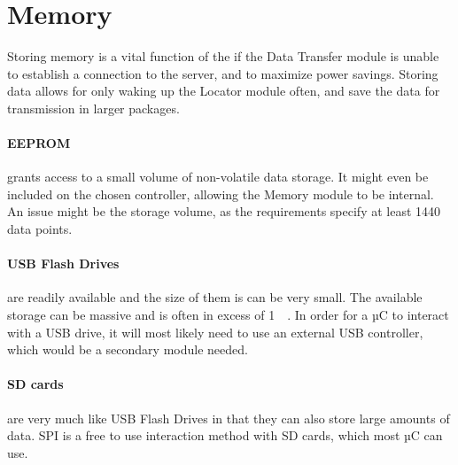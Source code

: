 \section{Memory}
Storing memory is a vital function of the \systemName if the Data Transfer module is unable to establish a connection to the server, and to maximize power savings.
Storing data allows for only waking up the Locator module often, and save the data for transmission in larger packages.
\paragraph{EEPROM} grants access to a small volume of non-volatile data storage.
It might even be included on the chosen controller, allowing the Memory module to be internal.
An issue might be the storage volume, as the requirements specify at least \num{1440} data points.

\paragraph{USB Flash Drives} are readily available and the size of them is can be very small.
The available storage can be massive and is often in excess of \SI{1}{\giga\byte}. In order for a µC to interact with a USB drive, it will most likely need to use an external USB controller, which would be a secondary module needed.

\paragraph{SD cards} are very much like USB Flash Drives in that they can also store large amounts of data. SPI is a free to use interaction method with SD cards, which most µC can use.

\FloatBarrier
